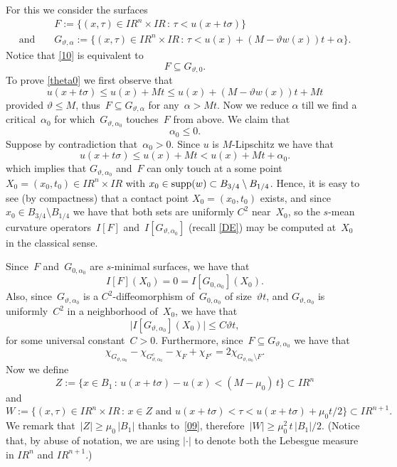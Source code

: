 \documentclass[11pt]{amsart}
\begin{document}
For this we consider the surfaces
\begin{eqnarray*}
&& F:=\{ (x,\tau)\in{{I\!\!R}}^n\times{{I\!\!R}} \,:\, \tau<u(x+t\sigma)\}\\
{\mbox{and }}&& G_{{\vartheta},\alpha}:=
\{ (x,\tau)\in{{I\!\!R}}^n\times{{I\!\!R}} \,:\, \tau<u(x)+(M-{\vartheta} w(x))t+\alpha\}.
\end{eqnarray*}
Notice that \eqref{10} is equivalent to 
\begin{equation}\label{theta0}
F \subseteq G_{{\vartheta},0}.
\end{equation}
To prove \eqref{theta0} we first observe that
$$ u(x+t\sigma){\leqslant} u(x)+Mt{\leqslant} u(x)+(M-{\vartheta} w(x))t+Mt$$
provided ${\vartheta} {\leqslant} M$, 
thus~$F\subseteq G_{{\vartheta},\alpha}$ for any~$\alpha>Mt$. Now we reduce $\alpha$
till we find a critical~$\alpha_0$ for which~$G_{{\vartheta},\alpha_0}$
touches~$F$ from above. We claim that
\begin{equation}\label{theta0.1}
\alpha_0{\leqslant}0.\end{equation}
Suppose by contradiction that~$\alpha_0>0$. Since $u$ is $M$-Lipschitz
we have that
$$
u(x+t\sigma) {\leqslant} u(x)+Mt <u(x)+Mt+\alpha_0.
$$
which implies that $G_{{\vartheta},\alpha_0}$
and~$F$ can only touch at a some point~$X_0=(x_0,t_0)\in{{I\!\!R}}^n\times {{I\!\!R}}$
with $x_0 \in {\rm supp}(w)\subset B_{3/4}\setminus B_{1/4}$.
Hence, it is easy to see (by compactness) that a contact point $X_0=(x_0,t_0)$ exists,
and since  $x_0 \in B_{3/4}\setminus B_{1/4}$ we have that 
both sets are uniformly $C^2$ near~$X_0$, so the 
$s$-mean curvature operators~$I[F]$ and~$I[G_{{\vartheta},\alpha_0}]$ (recall \eqref{DE})
may be computed at~$X_0$ in the classical sense.

Since~$F$ and~$G_{0,\alpha_0}$ are $s$-minimal surfaces, we have that
\begin{equation}\label{co1}
I[F](X_0)=0=I[G_{0,\alpha_0}](X_0).
\end{equation}
Also, since~$G_{{\vartheta},\alpha_0}$ is a $C^2$-diffeomorphism of~$G_{0,\alpha_0}$
of size~${\vartheta} t$, and $G_{{\vartheta},\alpha_0}$ is uniformly~$C^2$
in a neighborhood of~$X_0$, we have that
\begin{equation}\label{co2}
\big|I[G_{{\vartheta},\alpha_0}](X_0)\big|{\leqslant} C{\vartheta} t,
\end{equation}
for some universal constant~$C>0$.
Furthermore, since~$F\subseteq G_{{\vartheta},\alpha_0}$ we have that
\begin{equation}\label{219}
\chi_{G_{{\vartheta},\alpha_0}}-\chi_{G_{{\vartheta},\alpha_0}^c}-\chi_F+\chi_{F^c}=2\chi_{G_{{\vartheta},\alpha_0}\setminus F}.\end{equation}
Now we define
$$ Z:=
\big\{x\in B_1\,:\,
u(x+t \sigma)-u(x)< (M-\mu_0)\,t
\big\}\subset{{I\!\!R}}^n$$
and
$$ W:=\big\{ (x,\tau)\in{{I\!\!R}}^n\times {{I\!\!R}} \,:\, x\in Z {\mbox{ and }} u(x+t\sigma)<\tau<u(x+t\sigma)+\mu_0t/2\big\}
\subset{{I\!\!R}}^{n+1}.$$
We remark that~$|Z|{\geqslant}\mu_0\,|B_1|$ thanks to~\eqref{09},
therefore~$|W|{\geqslant} \mu_0^2\,t\,|B_1|/2$. 
(Notice that, by abuse of notation, we are using $|\cdot|$ to denote both the Lebesgue measure in ${{I\!\!R}}^n$ and ${{I\!\!R}}^{n+1}$.)
\end{document}
